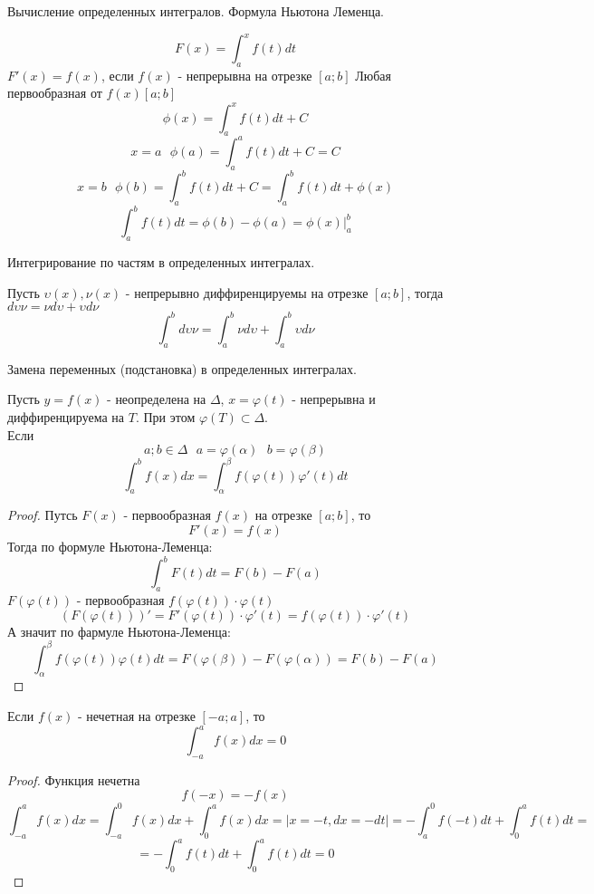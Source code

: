 \begin{title}
  Вычисление определенных интегралов. Формула Ньютона Леменца.
\end{title}

\[F(x) = \int^x_a f(t)dt\]
$F'(x) = f(x)$, если $f(x)$ - непрерывна на отрезке $[a; b]$ Любая первообразная
от $f(x) [a; b]$
\[\phi (x) = \int^x_a f(t)dt + C\]
\[x = a ~~~ \phi (a) = \int^a_a f(t)dt + C = C\]
\[x = b ~~~ \phi (b) = \int^b_a f(t)dt + C = \int^b_a f(t)dt + \phi(x)\]
\[\int^b_a f(t)dt = \phi(b) - \phi(a) = \phi(x)|^b_a\]

\begin{title}[\Large]
  Интегрирование по частям в определенных интегралах.
\end{title}

\begin{theorem}
  Пусть $\upsilon (x), \nu(x)$ - непрерывно диффиренцируемы на отрезке $[a; b]$,
  тогда $d\upsilon \nu = \nu d \upsilon + \upsilon d \nu$
  \[\int^b_a d\upsilon \nu = \int^b_a \nu d \upsilon +
    \int ^b_a \upsilon d \nu\]
\end{theorem}

\begin{title}[\Large]
  Замена переменных (подстановка) в определенных интегралах.
\end{title}

\begin{theorem}
  Пусть $y = f(x)$ - неопределена на $\Delta$, $x = \varphi (t)$ - непрерывна и
  диффиренцируема на $T$. При этом $\varphi (T) \subset \Delta$.\\
  Если
  \[a; b \in \Delta ~~~ a = \varphi (\alpha) ~~~ b = \varphi (\beta)\]
  \[\int^b_a f(x)dx = \int^{\beta}_{\alpha} f(\varphi (t)) \varphi' (t)dt\]
\end{theorem}

\begin{proof}
  Путсь $F(x)$ - первообразная $f(x)$ на отрезке $[a; b]$, то
  \[F'(x) = f(x)\]
  Тогда по формуле Ньютона-Леменца:
  \[\int^b_a F(t)dt = F(b) - F(a)\]
  $F(\varphi (t))$ - первообразная $f(\varphi (t)) \cdot \varphi(t)$
  \[(F(\varphi (t)))' = F'(\varphi (t)) \cdot \varphi' (t) = f(\varphi(t))
    \cdot \varphi'(t)\]
  А значит по фармуле Ньютона-Леменца:
  \[\int^{\beta}_{\alpha} f(\varphi (t)) \varphi (t)dt = F(\varphi (\beta)) -
    F(\varphi (\alpha)) = F(b) - F(a)\]
\end{proof}

\begin{theorem}
  Если $f(x)$ - нечетная на отрезке $[-a; a]$, то
  \[\int^a_{-a} f(x)dx = 0\]
\end{theorem}

\begin{proof}
  Функция нечетна
  \[f(-x) = -f(x)\]
  \[\int^a_{-a} f(x)dx = \int^0_{-a} f(x)dx + \int^a_0 f(x)dx =
    |x = -t, dx = -dt| = -\int^0_a f(-t)dt + \int^a_0 f(t)dt =\]
    \[= -\int^a_0 f(t)dt + \int^a_0 f(t)dt = 0\]
\end{proof}